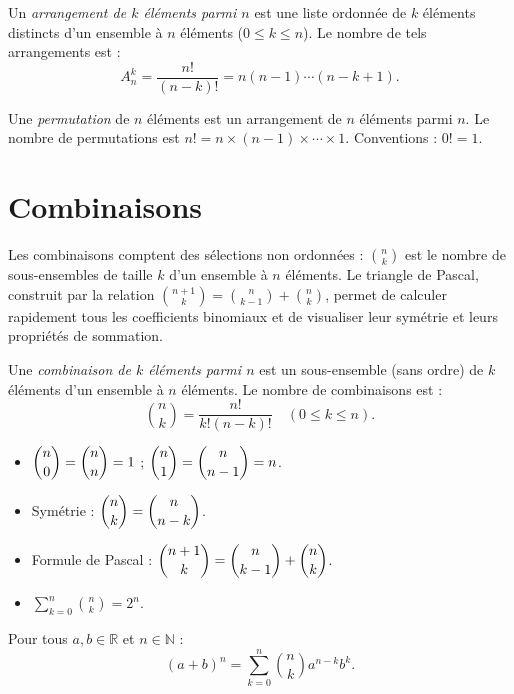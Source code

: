 \documentclass[11pt,a4paper,twoside]{book}
\newcommand{\N}{\mathbb{N}}
\newcommand{\R}{\mathbb{R}}
\begin{document}
\begin{definitionbox}
Un \emph{arrangement de $k$ éléments parmi $n$} est une liste ordonnée de $k$ éléments
distincts d'un ensemble à $n$ éléments ($0 \leq k \leq n$). Le nombre de tels arrangements est :
\[
  A_n^k = \frac{n!}{(n-k)!} = n(n-1)\cdots(n-k+1).
\]
\end{definitionbox}

\begin{definitionbox}[Permutations]
Une \emph{permutation} de $n$ éléments est un arrangement de $n$ éléments parmi $n$.
Le nombre de permutations est $n! = n \times (n-1) \times \cdots \times 1$.
Conventions : $0! = 1$.
\end{definitionbox}

\section{Combinaisons}

Les combinaisons comptent des sélections non ordonnées : $\binom{n}{k}$ est le nombre de sous-ensembles de taille $k$ d'un ensemble à $n$ éléments. Le triangle de Pascal, construit par la relation $\binom{n+1}{k} = \binom{n}{k-1} + \binom{n}{k}$, permet de calculer rapidement tous les coefficients binomiaux et de visualiser leur symétrie et leurs propriétés de sommation.

\begin{definitionbox}[Combinaisons]
Une \emph{combinaison de $k$ éléments parmi $n$} est un sous-ensemble (sans ordre) de $k$
éléments d'un ensemble à $n$ éléments. Le nombre de combinaisons est :
\[
  \binom{n}{k} = \frac{n!}{k!(n-k)!} \quad (0 \leq k \leq n).
\]
\end{definitionbox}

\begin{theoremebox}
\begin{itemize}
  \item $\dbinom{n}{0} = \dbinom{n}{n} = 1$ ; $\dbinom{n}{1} = \dbinom{n}{n-1} = n$.
  \item Symétrie : $\dbinom{n}{k} = \dbinom{n}{n-k}$.
  \item Formule de Pascal : $\dbinom{n+1}{k} = \dbinom{n}{k-1} + \dbinom{n}{k}$.
  \item $\displaystyle\sum_{k=0}^n \binom{n}{k} = 2^n$.
\end{itemize}
\end{theoremebox}

\begin{theoremebox}
Pour tous $a, b \in \R$ et $n \in \N$ :
\[
  (a+b)^n = \sum_{k=0}^n \binom{n}{k} a^{n-k} b^k.
\]
\end{theoremebox}
\end{document}
